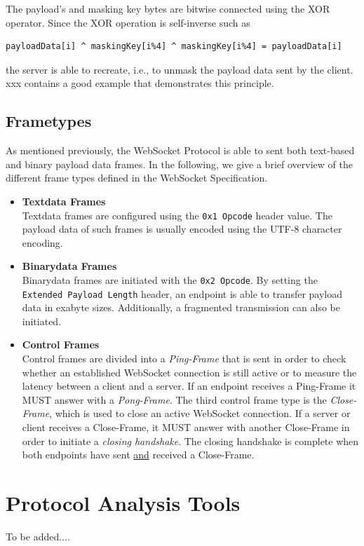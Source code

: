 \documentclass[a4paper, justified, notoc]{tufte-handout} %
\begin{document}
The payload's and masking key bytes are bitwise connected using the XOR operator. Since the XOR operation is self-inverse such as 
\begin{Verbatim}
payloadData[i] ^ maskingKey[i%4] ^ maskingKey[i%4] = payloadData[i]
\end{Verbatim}
the server is able to recreate, i.e., to unmask the payload data sent by the client.
xxx contains a good example that demonstrates this principle.

\subsection{Frametypes} %
\label{sub:frametypes}

As mentioned previously, the WebSocket Protocol is able to sent both text-based and binary payload data frames. 
In the following, we give a brief overview of the different frame types defined in the WebSocket Specification.

\begin{itemize}
	\item \textbf{Textdata Frames} \\
	Textdata frames are configured using the \texttt{0x1 Opcode} header value. The payload data of such frames is usually encoded using the UTF-8 character encoding.
	\item \textbf{Binarydata Frames} \\
	Binarydata frames are initiated with the \texttt{0x2 Opcode}. By setting the \texttt{Extended Payload Length} header, an endpoint is able to transfer payload data in exabyte sizes. Additionally, a fragmented transmission can also be initiated. 	
	\item \textbf{Control Frames} \\
	Control frames are divided into a \emph{Ping-Frame} that is sent in order to check whether an established WebSocket connection is still active or to measure the latency between a client and a server. If an endpoint receives a Ping-Frame it MUST answer with a \emph{Pong-Frame}. The third control frame type is the \emph{Close-Frame}, which is used to close an active WebSocket connection. If a server or client receives a Close-Frame, it MUST answer with another Close-Frame in order to initiate a \emph{closing handshake}. The closing handshake is complete when both endpoints have sent \underline{and} received a Close-Frame.
\end{itemize}

\section{Protocol Analysis Tools } %
\label{sec:protocol_analysis_tools}
To be added....
\end{document}
